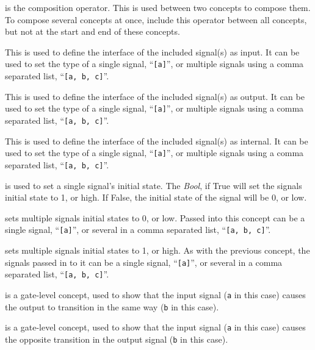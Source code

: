 \documentclass[british,technote,compsoc]{IEEEtran}
\begin{document}
\begin{description}[align=left]
   \item [\texttt{<>}] is the composition operator. This is used between two concepts to compose them. To compose several concepts at once, include this operator between all concepts, 
   but not at the start and end of these concepts. 
   
   \item [\texttt{inputs [a, ...]}] This is used to define the interface of the included signal(s) as input. It can be used to set the type of a single signal, ``\texttt{[a]}'', or multiple signals   
   using a comma separated list, ``\texttt{[a, b, c]}''.
   
   \item [\texttt{outputs [a, ...]}] This is used to define the interface of the included signal(s) as output. It can be used to set the type of a single signal, ``\texttt{[a]}'', or multiple signals 
   using a comma separated list, ``\texttt{[a, b, c]}''.
   
   \item [\texttt{internals [a, ...]}] This is used to define the interface of the included signal(s) as internal. It can be used to set the type of a single signal, ``\texttt{[a]}'', or multiple 
   signals using a comma separated list, ``\texttt{[a, b, c]}''.
  
  \item [\texttt{initialise a} \emph{Bool}] is used to set a single signal's initial state. The \emph{Bool}, if True will set the signals initial state to 1, or high. If False, the initial state of the 
  signal will be 0, or low. 

  \item [\texttt{initialise0 [a, ...]}] sets multiple signals initial states to 0, or low. Passed into this concept can be a single signal, ``\texttt{[a]}'', or several in a comma separated list, 
  ``\texttt{[a, b, c]}''.
  
  \item [\texttt{initialise1 [a, ...]}] sets multiple signals initial states to 1, or high. As with the previous concept, the signals passed in to it can be a single signal, ``\texttt{[a]}'', or several 
in a comma separated list, ``\texttt{[a, b, c]}''.
  
  \item [\texttt{buffer a b}] is a gate-level concept, used to show that the input signal (\texttt{a} in this case) causes the output to transition in the same way (\texttt{b} in this case). 
  
  \item [\texttt{inverter a b}] is a gate-level concept, used to show that the input signal (\texttt{a} in this case) causes the opposite transition in the output signal (\texttt{b} in this case).
  

\end{description}
\end{document}
